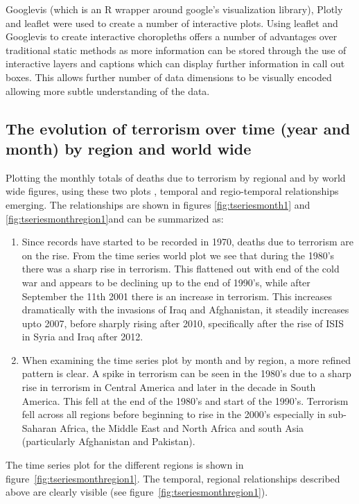 Googlevis (which is an R wrapper around google's visualization library), Plotly \citep{plotlymanual2016} and leaflet \citep{leaflet2016} were used to create a number of interactive plots. Using leaflet and Googlevis to create interactive choropleths offers a number of advantages over traditional static methods as more information can be stored through the use of interactive layers and captions which can display further information in call out boxes. This allows further number of data dimensions to be visually encoded allowing more subtle understanding of the data.

\subsection{The evolution of terrorism over time (year and month) by
region and world wide}\label{sec:evteryearmonth}

Plotting the monthly totals of deaths due to terrorism by regional and by world wide figures,  using these two plots , temporal and regio-temporal relationships emerging. The relationships are shown in figures \ref{fig:tseriesmonth1} and \ref{fig:tseriesmonthregion1}and can be summarized as:

\begin{enumerate}
\item
  Since records have started to be recorded in 1970, deaths due to terrorism are on the rise. From the time series world plot we see that during the 1980's there was a sharp rise in terrorism. This flattened out with end of the cold war and appears to be declining up to the end of 1990's, while after September the 11th 2001 there is an increase in  terrorism. This increases dramatically with the invasions of Iraq and  Afghanistan, it steadily increases upto 2007, before sharply rising after 2010, specifically after the rise of ISIS in Syria and Iraq after 2012.
\item
  When examining the time series plot by month and by region, a more  refined pattern is clear. A spike in terrorism can be seen in the 1980's due to a sharp rise in terrorism in Central America and later in the decade in South America. This fell at the end of the 1980's and start of the 1990's. Terrorism fell across all regions before beginning to rise in the 2000's especially in sub-Saharan Africa, the Middle East and North Africa and south Asia (particularly Afghanistan and Pakistan).
\end{enumerate}
The time series plot for the different regions is shown in figure~\ref{fig:tseriesmonthregion1}. The
temporal, regional relationships described above are clearly visible (see figure~\ref{fig:tseriesmonthregion1}).

